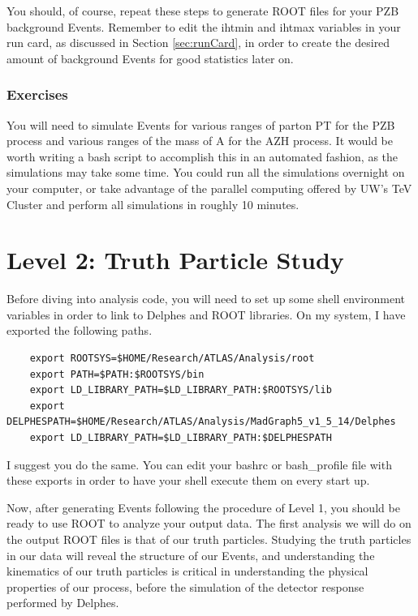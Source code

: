 \documentclass{article}
\begin{document}
\bigskip

You should, of course, repeat these steps to generate ROOT files for your PZB background Events. Remember
to edit the ihtmin and ihtmax variables in your run card, as discussed in Section \ref{sec:runCard}, in order to create the desired
amount of background Events for good statistics later on.

\subsubsection*{Exercises}

You will need to simulate Events for various ranges of parton PT for the PZB process and various ranges of the mass of A for the AZH process.
It would be worth writing a bash script to accomplish this in an automated fashion, as the simulations may take some time.
You could run all the simulations overnight on your computer, or take advantage of the parallel computing offered by UW's TeV Cluster
and perform all simulations in roughly 10 minutes.

\section{Level 2: Truth Particle Study}

Before diving into analysis code, you will need to set up some shell environment variables in order to link to
Delphes and ROOT libraries. On my system, I have exported the following paths.

\begin{verbatim}
	export ROOTSYS=$HOME/Research/ATLAS/Analysis/root
	export PATH=$PATH:$ROOTSYS/bin
	export LD_LIBRARY_PATH=$LD_LIBRARY_PATH:$ROOTSYS/lib
	export DELPHESPATH=$HOME/Research/ATLAS/Analysis/MadGraph5_v1_5_14/Delphes
	export LD_LIBRARY_PATH=$LD_LIBRARY_PATH:$DELPHESPATH
\end{verbatim}

I suggest you do the same. You can edit your bashrc or bash\_profile file with these exports in order to have your
shell execute them on every start up.

\bigskip

Now, after generating Events following the procedure of Level 1, you should be ready to use
ROOT to analyze your output data. The first analysis we will do on the output ROOT files
is that of our truth particles. Studying the truth particles in our data will reveal the
structure of our Events, and understanding the kinematics of our truth particles is critical
in understanding the physical properties of our process, before the simulation of the detector
response performed by Delphes.
\end{document}
